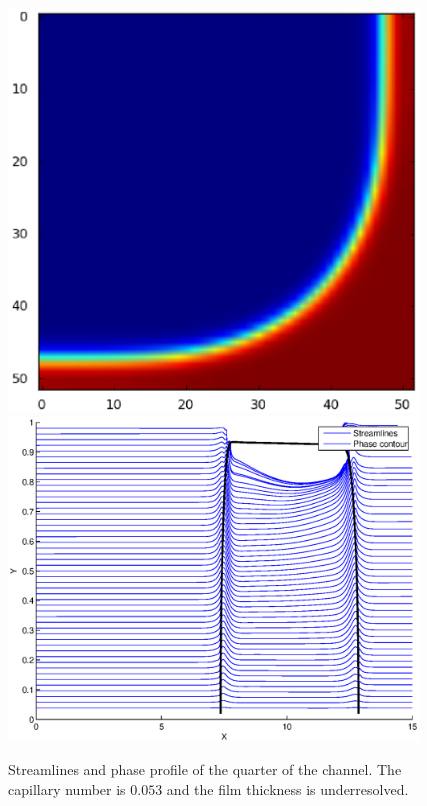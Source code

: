 \documentclass{article}
\begin{document}
\begin{figure}
\includegraphics[width=0.97\textwidth]{Figures/quarter.eps}\\ %
\includegraphics[width=0.97\textwidth]{Figures/stream_cap01.eps}\\
\caption{Streamlines and phase profile of the quarter of the channel. The capillary number is
$0.053$ and the film thickness is underresolved. \label{fig:quarter:capillary:capillary01}}
\end{figure}
\end{document}
